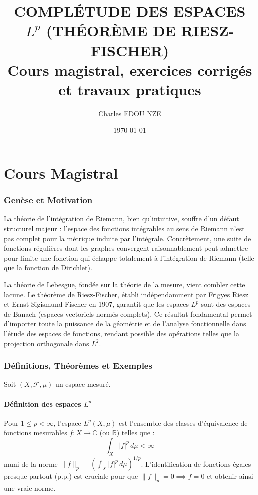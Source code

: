 \documentclass[11pt,a4paper]{article}
\title{\Huge COMPLÉTUDE DES ESPACES $L^p$ (THÉORÈME DE RIESZ-FISCHER) \\ \large Cours magistral, exercices corrigés et travaux pratiques}
\author{\Large Charles EDOU NZE}
\date{\today}
\begin{document}
\maketitle
\tableofcontents
\newpage

\part{Cours Magistral}



\section{Genèse et Motivation}

La théorie de l'intégration de Riemann, bien qu'intuitive, souffre d'un défaut structurel majeur : l'espace des fonctions intégrables au sens de Riemann n'est pas complet pour la métrique induite par l'intégrale. Concrètement, une suite de fonctions régulières dont les graphes convergent raisonnablement peut admettre pour limite une fonction qui échappe totalement à l'intégration de Riemann (telle que la fonction de Dirichlet).

La théorie de Lebesgue, fondée sur la théorie de la mesure, vient combler cette lacune. Le théorème de Riesz-Fischer, établi indépendamment par Frigyes Riesz et Ernst Sigismund Fischer en 1907, garantit que les espaces $L^p$ sont des espaces de Banach (espaces vectoriels normés complets). Ce résultat fondamental permet d'importer toute la puissance de la géométrie et de l'analyse fonctionnelle dans l'étude des espaces de fonctions, rendant possible des opérations telles que la projection orthogonale dans $L^2$.

\section{Définitions, Théorèmes et Exemples}

Soit $(X, \mathcal{F}, \mu)$ un espace mesuré.

\subsection{Définition des espaces $L^p$}
Pour $1 \le p < \infty$, l'espace $L^p(X, \mu)$ est l'ensemble des classes d'équivalence de fonctions mesurables $f : X \to \mathbb{C}$ (ou $\mathbb{R}$) telles que :
$$ \int_X |f|^p \, d\mu < \infty $$
muni de la norme $\|f\|_p = \left( \int_X |f|^p \, d\mu \right)^{1/p}$. L'identification de fonctions égales presque partout (p.p.) est cruciale pour que $\|f\|_p = 0 \implies f = 0$ et obtenir ainsi une vraie norme.
\end{document}
